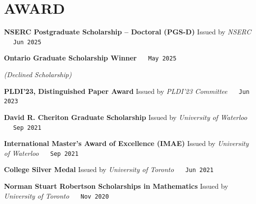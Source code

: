 \documentclass[fontsize=11pt]{article}
\newcommand{\NewPart}[1]{\section*{\uppercase{#1}}}
\newcommand{\EducationEntry}[4]{
    \noindent \textbf{#1} \hfill      %
    \colorbox{Black}{ 
      \parbox{11em}{
      \centering \color{White}#2}} \par  %
    \noindent \textit{#3} \par        %
    \noindent\hangindent=0em\hangafter=0 \small #4 %
    \normalsize \par}
\newcommand{\ProjectEntry}[4]{         %
    \noindent \textbf{#1}  \hfill {#2} \par
    \noindent \if\relax\detokenize{#3}\relax\else\underline{\textit{#3}}\quad\fi \small #4 %
    \normalsize \par}
\newcommand{\AwardEntry}[4]{         %
    \noindent \textbf{#1} \noindent \hfill Issued by \textit{#3}  
    $\quad$ \texttt{#2} %
    }
\begin{document}
    
    
    
    
    

    \NewPart{Award}{}

    \AwardEntry
    {NSERC Postgraduate Scholarship -- Doctoral (PGS-D)}
    {Jun 2025}
    {NSERC}
    {}

    \noindent \textbf{Ontario Graduate Scholarship Winner} \noindent \hfill
    $\quad$ \texttt{May 2025} \par
    \noindent \textit{(Declined Scholarship)}

    \AwardEntry
    {PLDI'23, Distinguished Paper Award}
    {Jun 2023}
    {PLDI'23 Committee}
    {}
    
    \AwardEntry
    {David R. Cheriton Graduate Scholarship}
    {Sep 2021}
    {University of Waterloo}
    {}
    
    \AwardEntry
    {International Master’s Award of Excellence (IMAE)}
    {Sep 2021}
    {University of Waterloo}
    {}
    
    \AwardEntry
    {College Silver Medal}
    {Jun 2021}
    {University of Toronto}
    {}
    
    \AwardEntry
    {Norman Stuart Robertson Scholarships in Mathematics}
    {Nov 2020}
    {University of Toronto}
    {}
    
\end{document}
